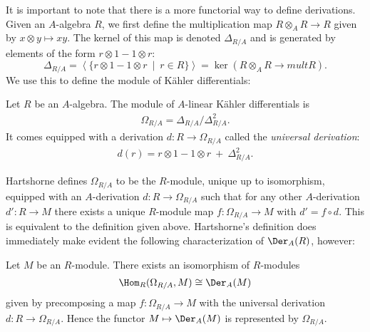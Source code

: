 It is important to note that there is a more functorial way to define derivations. Given an $A$-algebra $R$, we first define the multiplication map $R\otimes_A R\to R$ given by $x\otimes y\mapsto xy$. The kernel of this map is denoted $\Delta_{R/A}$ and is generated by elements of the form $r\otimes 1 - 1\otimes r$:
\begin{equation}\label{eqn:delta-module}
	\Delta_{R/A} = \left\langle \{r\otimes 1 - 1\otimes r ~\mid~ r\in R\} \right\rangle = \ker(R\otimes_A R \to{mult} R).
\end{equation}
We use this to define the module of K\"ahler differentials:
\begin{defn}\label{defn:kahler-diff}
	Let $R$ be an $A$-algebra. The module of $A$-linear K\"ahler differentials is
	\begin{align*}
		\Omega_{R/A} = \Delta_{R/A}/\Delta_{R/A}^2.
	\end{align*}
	It comes equipped with a derivation $d:R\to \Omega_{R/A}$ called the \emph{universal derivation}:
	\begin{align*}
		d(r) = r \otimes 1 - 1\otimes r ~+~ \Delta_{R/A}^2.
	\end{align*}
\end{defn}
Hartshorne defines $\Omega_{R/A}$ to be the $R$-module, unique up to isomorphism, equipped with an $A$-derivation $d:R\to \Omega_{R/A}$ such that for any other $A$-derivation $d':R\to M$ there exists a unique $R$-module map $f:\Omega_{R/A} \to M$ with $d' = f\circ d$. This is equivalent to the definition given above. Hartshorne's definition does immediately make evident the following characterization of $\Der_A(R)$, however:
\begin{prop}\label{prop:derivation-characterization}
	Let $M$ be an $R$-module. There exists an isomorphism of $R$-modules
	\begin{align*}
		\Hom_R(\Omega_{R/A},M) \cong \Der_A(M)
	\end{align*}
	given by precomposing a map $f:\Omega_{R/A}\to M$ with the universal derivation $d:R\to \Omega_{R/A}$. Hence the functor $M\mapsto \Der_A(M)$ is represented by $\Omega_{R/A}$.
\end{prop}
